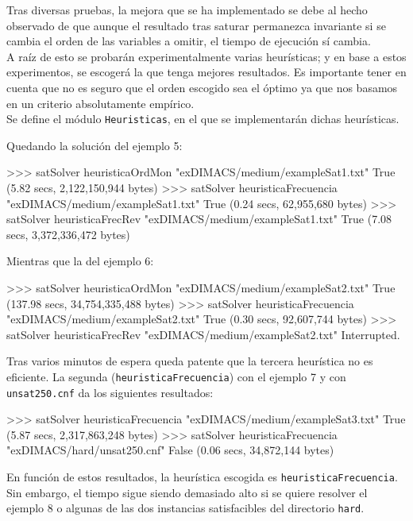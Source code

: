 Tras diversas pruebas, la mejora que se ha implementado se debe al hecho observado de que aunque el resultado tras saturar permanezca invariante si se cambia el orden de las variables a omitir, el tiempo de ejecución sí cambia.\\

A raíz de esto se probarán experimentalmente varias heurísticas; y en base a estos experimentos, se escogerá la que tenga mejores resultados. Es importante tener en cuenta que no es seguro que el orden escogido sea el óptimo ya que nos basamos en un criterio absolutamente empírico.\\

Se define el módulo \texttt{Heuristicas}, en el que se implementarán dichas heurísticas.


Quedando la solución del ejemplo 5:

\begin{code}
>>> satSolver heuristicaOrdMon "exDIMACS/medium/exampleSat1.txt"
True
(5.82 secs, 2,122,150,944 bytes)
>>> satSolver heuristicaFrecuencia "exDIMACS/medium/exampleSat1.txt"
True
(0.24 secs, 62,955,680 bytes)
>>> satSolver heuristicaFrecRev "exDIMACS/medium/exampleSat1.txt"
True
(7.08 secs, 3,372,336,472 bytes)
\end{code}

Mientras que la del ejemplo 6:

\begin{code}
>>> satSolver heuristicaOrdMon "exDIMACS/medium/exampleSat2.txt"
True
(137.98 secs, 34,754,335,488 bytes)
>>> satSolver heuristicaFrecuencia "exDIMACS/medium/exampleSat2.txt"
True
(0.30 secs, 92,607,744 bytes)
>>> satSolver heuristicaFrecRev "exDIMACS/medium/exampleSat2.txt"
Interrupted.
\end{code}

Tras varios minutos de espera queda patente que la tercera heurística no es eficiente.  La segunda (\texttt{heuristicaFrecuencia}) con el ejemplo 7 y con \texttt{unsat250.cnf} da los siguientes resultados:

\begin{code}
>>> satSolver heuristicaFrecuencia "exDIMACS/medium/exampleSat3.txt"
True
(5.87 secs, 2,317,863,248 bytes)
>>> satSolver heuristicaFrecuencia "exDIMACS/hard/unsat250.cnf"
False
(0.06 secs, 34,872,144 bytes)
\end{code}

En función de estos resultados, la heurística escogida es \texttt{heuristicaFrecuencia}. Sin embargo, el tiempo sigue siendo demasiado alto si se quiere resolver el ejemplo 8 o algunas de las dos instancias satisfacibles del directorio \texttt{hard}.